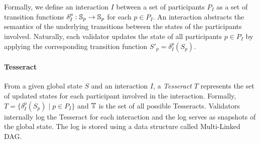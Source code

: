 Formally, we define an interaction $I$ between a set of participants $P_I$ as a set of transition functions $\delta_I^p:\mathbb{S}_p\to\mathbb{S}_p$ for each $p\in P_I$. An interaction abstracts the semantics of the underlying transitions between the states of the participants involved. Naturally, each validator updates the state of all participants $p \in P_I$ by applying the corresponding transition function $S'_p = \delta_I^p(S_p)$.



\paragraph{\textbf{Tesseract}}
From a given global state $S$ and an interaction $I$, a \textit{Tesseract} $T$ represents the set of updated states for each participant involved in the interaction. Formally, $T=\{\delta_I^p(S_p)\mid p\in P_I\}$ and $\mathbb{T}$ is the set of all possible Tesseracts. Validators internally log the Tesseract for each interaction and the log serves as snapshots of the global state. The log is stored using a data structure called Multi-Linked DAG.


